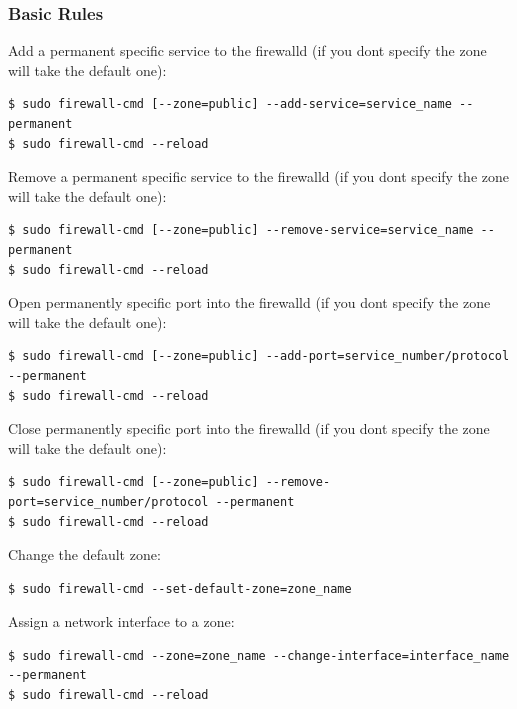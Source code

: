 \documentclass{article}
\newenvironment{codetemplate}[1][]{%
  \mybasecolorbox[#1]
  \itshape
}{%
  \endmybasecolorbox
}
\begin{document}
\subsubsection{Basic Rules}
Add a permanent specific service to the firewalld (if you dont specify the zone will take the default one):
\begin{codetemplate}
\begin{verbatim}
$ sudo firewall-cmd [--zone=public] --add-service=service_name --permanent
$ sudo firewall-cmd --reload  
\end{verbatim}
\end{codetemplate}

Remove a permanent specific service to the firewalld (if you dont specify the zone will take the default one):
\begin{codetemplate}
\begin{verbatim}
$ sudo firewall-cmd [--zone=public] --remove-service=service_name --permanent
$ sudo firewall-cmd --reload  
\end{verbatim}
\end{codetemplate}

Open permanently specific port into the firewalld (if you dont specify the zone will take the default one):
\begin{codetemplate}
\begin{verbatim}
$ sudo firewall-cmd [--zone=public] --add-port=service_number/protocol --permanent
$ sudo firewall-cmd --reload  
\end{verbatim}
\end{codetemplate}

Close permanently specific port into the firewalld (if you dont specify the zone will take the default one):
\begin{codetemplate}
\begin{verbatim}
$ sudo firewall-cmd [--zone=public] --remove-port=service_number/protocol --permanent
$ sudo firewall-cmd --reload  
\end{verbatim}
\end{codetemplate}

Change the default zone:
\begin{codetemplate}
\begin{verbatim}
$ sudo firewall-cmd --set-default-zone=zone_name  
\end{verbatim}
\end{codetemplate}

Assign a network interface to a zone:
\begin{codetemplate}
\begin{verbatim}
$ sudo firewall-cmd --zone=zone_name --change-interface=interface_name --permanent
$ sudo firewall-cmd --reload
\end{verbatim}
\end{codetemplate}
\end{document}
